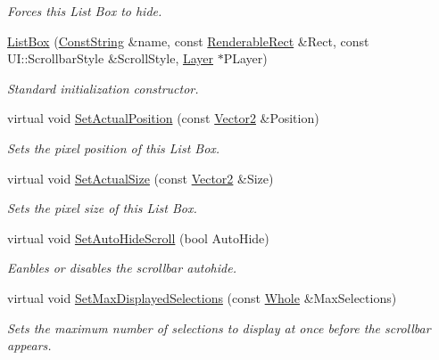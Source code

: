 \begin{DoxyCompactItemize}
\begin{DoxyCompactList}\small\item\em Forces this List Box to hide. \item\end{DoxyCompactList}\item 
\hyperlink{classphys_1_1UI_1_1ListBox_a2c61aa8ff40ff66eb45388a4e6cca5b2}{ListBox} (\hyperlink{namespacephys_a5ce5049f8b4bf88d6413c47b504ebb31}{ConstString} \&name, const \hyperlink{structphys_1_1UI_1_1RenderableRect}{RenderableRect} \&Rect, const UI::ScrollbarStyle \&ScrollStyle, \hyperlink{classphys_1_1UI_1_1Layer}{Layer} $\ast$PLayer)
\begin{DoxyCompactList}\small\item\em Standard initialization constructor. \item\end{DoxyCompactList}\item 
virtual void \hyperlink{classphys_1_1UI_1_1ListBox_a4bf1911c639429c783915ba8a543fec3}{SetActualPosition} (const \hyperlink{classphys_1_1Vector2}{Vector2} \&Position)
\begin{DoxyCompactList}\small\item\em Sets the pixel position of this List Box. \item\end{DoxyCompactList}\item 
virtual void \hyperlink{classphys_1_1UI_1_1ListBox_a742810da75f2b3889794498f05af8860}{SetActualSize} (const \hyperlink{classphys_1_1Vector2}{Vector2} \&Size)
\begin{DoxyCompactList}\small\item\em Sets the pixel size of this List Box. \item\end{DoxyCompactList}\item 
virtual void \hyperlink{classphys_1_1UI_1_1ListBox_a60fc5c1907df6d83217b25c2c8f15f48}{SetAutoHideScroll} (bool AutoHide)
\begin{DoxyCompactList}\small\item\em Eanbles or disables the scrollbar autohide. \item\end{DoxyCompactList}\item 
virtual void \hyperlink{classphys_1_1UI_1_1ListBox_acbc8e669d93665789453cb866996411b}{SetMaxDisplayedSelections} (const \hyperlink{namespacephys_a460f6bc24c8dd347b05e0366ae34f34a}{Whole} \&MaxSelections)
\begin{DoxyCompactList}\small\item\em Sets the maximum number of selections to display at once before the scrollbar appears. \item\end{DoxyCompactList}\item 

\end{DoxyCompactItemize}
